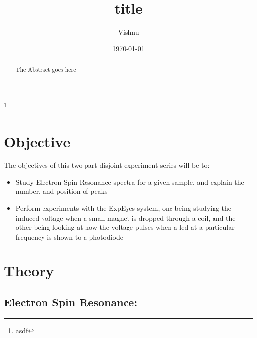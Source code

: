 \documentclass{double}
\begin{document}
\title{title}
\author{Vishnu} \thanks{asdf}
\date{\today}
\maketitle

\begin{abstract}

The Abstract goes here

\end{abstract}

\section{Objective}

The objectives of this two part disjoint experiment series will be to:

\begin{itemize}
\tightlist
\item
  Study Electron Spin Resonance spectra for a given sample, and explain the number, and position of peaks
\item
  Perform experiments with the ExpEyes system, one being studying the induced voltage when a small magnet is dropped through a coil, and the other being looking at how the voltage pulses when a led at a particular frequency is shown to a photodiode
\end{itemize}

\section{Theory}

\subsection{Electron Spin Resonance:}
\end{document}
